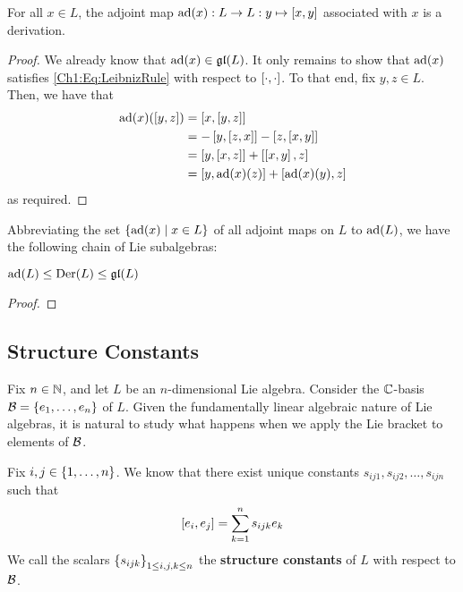 \begin{boxproposition}
    For all $x \in L$, the adjoint map $\operatorname{ad}\!\left( x \right) : L \to L : y \mapsto \left[ x, y \right]$ associated with $x$ is a derivation.
\end{boxproposition}
\begin{proof}
    We already know that $\operatorname{ad}\!\left( x \right) \in \mathfrak{gl}\!\left( L \right)$. It only remains to show that $\operatorname{ad}\!\left( x \right)$ satisfies \eqref{Ch1:Eq:LeibnizRule} with respect to $\left[ \cdot, \cdot \right]$. To that end, fix $y, z \in L$. Then, we have that
    \begin{align*}
        \operatorname{ad}\!\left( x \right)\!\left( \left[ y, z \right] \right)
        &= \left[ x, \left[ y, z \right] \right] \\
        &= - \left[ y, \left[ z, x \right] \right] - \left[ z, \left[ x, y \right] \right] \\
        &= \left[ y, \left[ x, z \right] \right] + \left[ \left[ x, y \right], z \right] \\
        &= \left[ y, \operatorname{ad}\!\left( x \right)\!(z) \right] + \left[ \operatorname{ad}\!\left( x \right)\!(y), z \right]
    \end{align*}
    as required.
\end{proof}

Abbreviating the set $\left\{ \operatorname{ad}\!\left( x \right) \; \middle\vert \; x \in L \right\}$ of all adjoint maps on $L$ to $\operatorname{ad}\!\left( L \right)$, we have the following chain of Lie subalgebras:

\begin{boxlemma}
    $\operatorname{ad}\!\left( L \right) \leq \operatorname{Der}\!\left( L \right) \leq \mathfrak{gl}\!\left( L \right)$
\end{boxlemma}
\begin{proof}
    \sorry
\end{proof}

\subsection{Structure Constants}

Fix $n \in \mathbb{N}$, and let $L$ be an $n$-dimensional Lie algebra. Consider the $\mathbb{C}$-basis $\mathcal{B} = \left\{ e_1, \ldots, e_n \right\}$ of $L$. Given the fundamentally linear algebraic nature of Lie algebras, it is natural to study what happens when we apply the Lie bracket to elements of $\mathcal{B}$.

\begin{boxdefinition}
    Fix $i, j \in \left\{ 1, \ldots, n \right\}$. We know that there exist unique constants $s_{ij1}, s_{ij2}, \ldots, s_{ijn}$ such that
    \begin{align*}
        \left[ e_i, e_j \right] = \sum_{k = 1}^{n} s_{ijk} e_k
    \end{align*}
    We call the scalars $\left\{ s_{ijk} \right\}_{1 \leq i, j, k \leq n}$ the \textbf{structure constants} of $L$ with respect to $\mathcal{B}$.
\end{boxdefinition}

